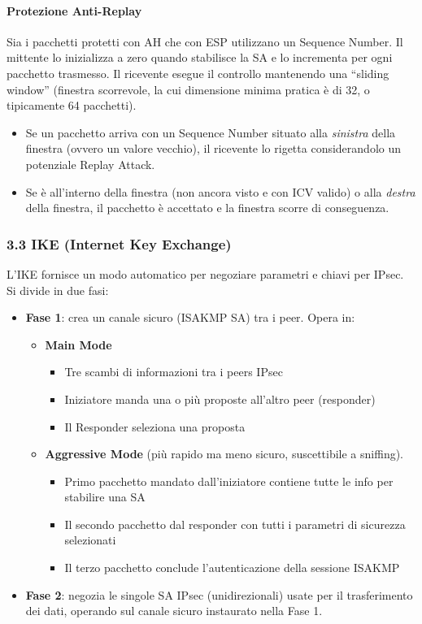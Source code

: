 \documentclass{article}
\begin{document}
\paragraph{Protezione Anti-Replay}
Sia i pacchetti protetti con AH che con ESP utilizzano un Sequence Number. 
Il mittente lo inizializza a zero quando stabilisce la SA e lo incrementa per ogni pacchetto trasmesso. Il ricevente esegue il controllo mantenendo una ``sliding window'' (finestra scorrevole, la cui dimensione minima pratica è di 32, o tipicamente 64 pacchetti).
\begin{itemize}
    \item Se un pacchetto arriva con un Sequence Number situato alla \emph{sinistra} della finestra (ovvero un valore vecchio), il ricevente lo rigetta considerandolo un potenziale Replay Attack.
    \item Se è all'interno della finestra (non ancora visto e con ICV valido) o alla \emph{destra} della finestra, il pacchetto è accettato e la finestra scorre di conseguenza.
\end{itemize}

\subsubsection{3.3 IKE (Internet Key Exchange)}
L'IKE fornisce un modo automatico per negoziare parametri e chiavi per IPsec. Si divide in due fasi:
\begin{itemize}
    \item \textbf{Fase 1}: crea un canale sicuro (ISAKMP SA) tra i peer. Opera in:
    \begin{itemize}
        \item \textbf{Main Mode}
        \begin{itemize}
            \item Tre scambi di informazioni tra i peers IPsec
            \item Iniziatore manda una o più proposte all'altro peer (responder)
            \item Il Responder seleziona una proposta
        \end{itemize}
        \item \textbf{Aggressive Mode} (più rapido ma meno sicuro, suscettibile a sniffing).
        \begin{itemize}
            \item Primo pacchetto mandato dall'iniziatore contiene tutte le info per stabilire una SA
            \item Il secondo pacchetto dal responder con tutti i parametri di sicurezza selezionati
            \item Il terzo pacchetto conclude l'autenticazione della sessione ISAKMP
        \end{itemize}
    \end{itemize}
    \item \textbf{Fase 2}: negozia le singole SA IPsec (unidirezionali) usate per il trasferimento dei dati, operando sul canale sicuro instaurato nella Fase 1.
\end{itemize}
\end{document}
